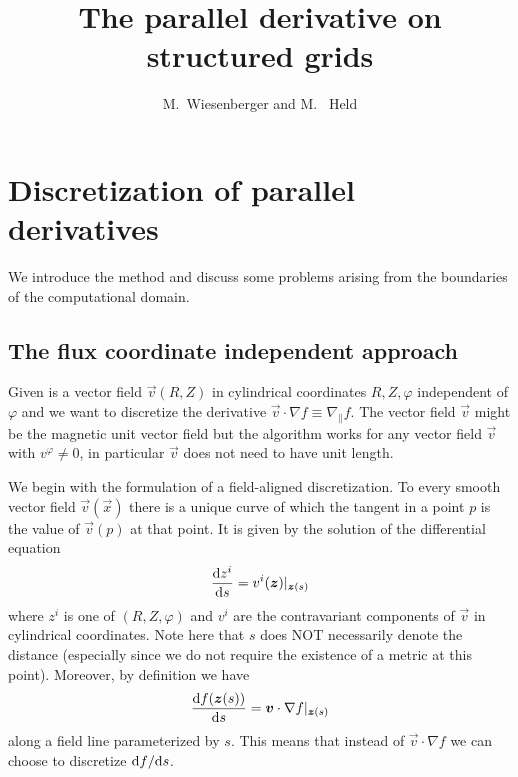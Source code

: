






\title{The parallel derivative on structured grids}
\author{M.~Wiesenberger and M.~ Held}

\maketitle

\section{Discretization of parallel derivatives} \label{sec:parallel}
We introduce the method
and discuss some problems arising from the boundaries of the computational domain.

\subsection{The flux coordinate independent approach} \label{sec:parallela}
Given is a vector field $\vec v(R,Z)$ in cylindrical coordinates $R,Z,\varphi$ independent of $\varphi$ and we want to
discretize the derivative $\vec v \cdot\nabla f \equiv \nabla_\parallel f$.
The vector field $\vec v$ might be the magnetic unit vector field but the algorithm works
for any vector field $\vec v$ with $v^\varphi\neq 0$, in particular $\vec v$ does not need
to have unit length.

We begin with the formulation of a field-aligned discretization.
To every smooth vector field $\vec v(\vec x)$ there is a unique curve of which the
tangent in a point $p$ is the value of $\vec v(p)$ at that point. It is given by
the solution of the differential equation
\begin{align}
  \frac{\mathrm{d} z^i}{\mathrm{d} s} = v^i({\boldsymbol{z}})|_{{\boldsymbol{z}}(s)}
    \label{eq:integralcurve}
\end{align}
where $z^i$ is one of $(R, Z, \varphi)$ and $v^i$ are the contravariant components
of $\vec v$ in cylindrical coordinates.
Note here that $s$ does NOT necessarily denote the distance
(especially since we do not require the existence of a metric at this point).
Moreover, by definition we have
\begin{align}
    \frac{\mathrm{d} f({\boldsymbol{z}}(s))}{\mathrm{d} s} = {\boldsymbol{v}}\cdot \nabla f|_{{\boldsymbol{z}}(s)}
    \label{eq:fieldline_original}
\end{align}
along a field line parameterized by $s$.
This means that instead of $\vec v \cdot \nabla f$ we can choose to discretize ${\mathrm{d} f}/{\mathrm{d} s}$.

